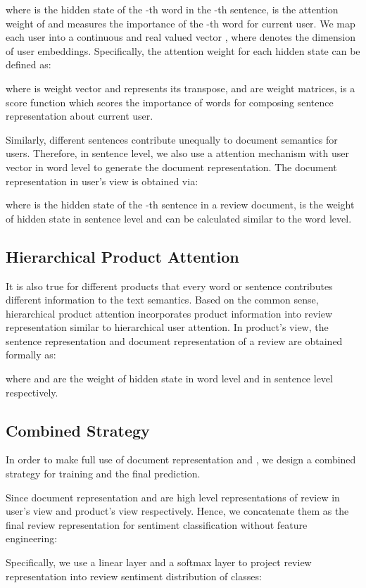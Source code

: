 \documentclass[letterpaper]{article} \usepackage{aaai18}  \usepackage{times}  \usepackage{helvet}  \usepackage{courier}  \usepackage{url}  \usepackage{graphicx}  \frenchspacing  \usepackage{amsmath}
\begin{document}
where  is the hidden state of the -th word in the -th sentence,  is the attention weight of  and measures the importance of the -th word for current user. We map each user  into a continuous and real valued vector , where  denotes the dimension of user embeddings. Specifically, the attention weight  for each hidden state can be defined as:

where  is weight vector and  represents its transpose,  and  are weight matrices,  is a score function which scores the importance of words for composing sentence representation about current user.

Similarly, different sentences contribute unequally to document semantics for users. Therefore, in sentence level, we also use a attention mechanism with user vector  in word level to generate the document representation. The document representation  in user's view is obtained via:

where  is the hidden state of the -th sentence in a review document,  is the weight of hidden state  in sentence level and can be calculated similar to the word level.

\subsection{Hierarchical Product Attention}
It is also true for different products that every word or sentence contributes different information to the text semantics. Based on the common sense, hierarchical product attention incorporates product information into review representation similar to hierarchical user attention. In product's view, the sentence representation  and document representation  of a review are obtained formally as:

where  and  are the weight of hidden state  in word level and  in sentence level respectively.

\subsection{Combined Strategy}
In order to make full use of document representation  and , we design a combined strategy for training and the final prediction.

Since document representation  and  are high level representations of review in user's view and product's view respectively. Hence, we concatenate them as the final review representation for sentiment classification without feature engineering:

Specifically, we use a linear layer and a softmax layer to project review representation  into review sentiment distribution of  classes:
\end{document}
